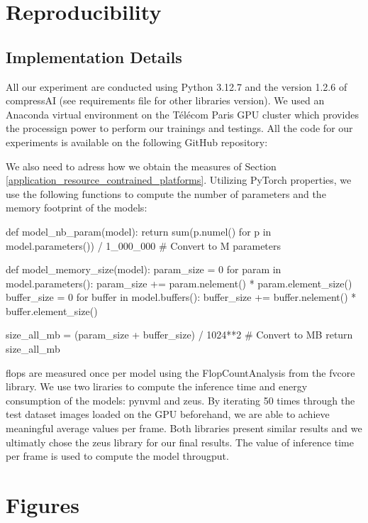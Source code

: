 \appendix

\chapter{Reproducibility}

\section{Implementation Details}
All our experiment are conducted using Python 3.12.7 and the version 1.2.6 of compressAI (see requirements file for other libraries version). We used an Anaconda virtual environment on the Télécom Paris GPU cluster which provides the processign power to perform our trainings and testings. All the code for our experiments is available on the following GitHub repository: \url{}

We also need to adress how we obtain the measures of Section \ref{application_resource_contrained_platforms}. Utilizing PyTorch properties, we use the following functions to compute the number of parameters and the memory footprint of the models:

\begin{pythonCode}
def model_nb_param(model):
    return sum(p.numel() for p in model.parameters()) / 1_000_000 # Convert to M parameters


def model_memory_size(model):
    param_size = 0
    for param in model.parameters():
        param_size += param.nelement() * param.element_size()
    buffer_size = 0
    for buffer in model.buffers():
        buffer_size += buffer.nelement() * buffer.element_size()

    size_all_mb = (param_size + buffer_size) / 1024**2 # Convert to MB
    return size_all_mb
\end{pythonCode}

\acrshort{flop}s are measured once per model using the \textsf{FlopCountAnalysis} from the fvcore library. We use two liraries to compute the inference time and energy consumption of the models: pynvml and zeus. By iterating 50 times through the test dataset images loaded on the GPU beforehand, we are able to achieve meaningful average values per frame. Both libraries present similar results and we ultimatly chose the zeus library for our final results. The value of inference time per frame is used to compute the model througput.

\chapter{Figures}

